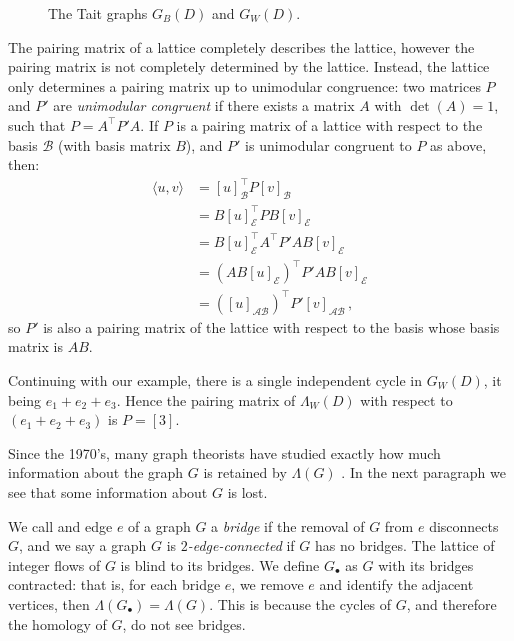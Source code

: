 \documentclass[12pt]{report}
\begin{document}
\begin{figure}[hbt]
	\centering
	\def\svgscale{0.4}
	
	\caption{The Tait graphs $G_{B}(D)$ and $G_{W}(D)$.}
	\label{fig:trefoil-abstract-tait}
\end{figure}

The pairing matrix of a lattice completely describes the lattice, however the pairing matrix is not completely determined by the lattice. Instead, the lattice only determines a pairing matrix up to unimodular congruence: two matrices $P$ and $P'$ are \textit{unimodular congruent} if there exists a matrix $A$ with $\det(A) = 1$, such that $P = A^{\top}P'A$. If $P$ is a pairing matrix of a lattice with respect to the basis $\mathcal{B}$ (with basis matrix $B$), and $P'$ is unimodular congruent to $P$ as above, then:
\begin{align*}
	\langle u, v \rangle & = [u]_{\mathcal{B}}^{\top} P [v]_{\mathcal{B}}                    \\
	                     & = B[u]_{\mathcal{E}}^{\top} P B[v]_{\mathcal{E}}                  \\
	                     & = B[u]_{\mathcal{E}}^{\top} A^{\top} P' A B[v]_{\mathcal{E}}      \\
	                     & = \left( AB[u]_{\mathcal{E}} \right)^{\top} P' AB[v]_{\mathcal{E}} \\
	                     & = \left( [u]_{\mathcal{AB}} \right)^{\top} P' [v]_{\mathcal{AB}}\,,
\end{align*}
so $P'$ is also a pairing matrix of the lattice with respect to the basis whose basis matrix is $AB$.


Continuing with our example, there is a single independent cycle in $G_{W}(D)$, it being $e_{1} + e_{2} + e_{3}$. Hence the pairing matrix of $\Lambda_{W}(D)$ with respect to $( e_{1} + e_{2} + e_{3})$ is $P = [3]$.

Since the 1970's, many graph theorists have studied exactly how much information about the graph $G$ is retained by $\Lambda(G)$ \parencite{lattice-of-flows-cuts, torelli-for-graphs-tropical-curves, lattice-of-flows-regular-matroid}. In the next paragraph we see that some information about $G$ is lost.

We call and edge $e$ of a graph $G$ a \textit{bridge} if the removal of $G$ from $e$ disconnects $G$, and we say a graph $G$ is \textit{$2$-edge-connected} if $G$ has no bridges. The lattice of integer flows of $G$ is blind to its bridges. We define $G_{\bullet}$ as $G$ with its bridges contracted: that is, for each bridge $e$, we remove $e$ and identify the adjacent vertices, then $\Lambda(G_{\bullet}) = \Lambda(G)$. This is because the cycles of $G$, and therefore the homology of $G$, do not see bridges.
\end{document}

